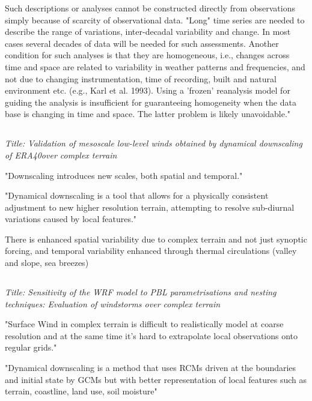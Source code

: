 \documentclass[12pt,a4paper]{article}
\begin{document}
Such descriptions or analyses cannot be constructed directly from observations simply because of scarcity of observational data. "Long" time series are needed to describe the range of variations, inter-decadal variability and change. In most cases several decades of data will be needed for such assessments. Another condition for such analyses is that they are homogeneous, i.e., changes across time and space are related to variability in weather patterns and frequencies, and not due to changing instrumentation, time of recording, built and natural environment etc. (e.g., Karl et al. 1993). Using a 'frozen' reanalysis model for guiding the analysis is insufficient for guaranteeing homogeneity when the data base is changing in time and space. The latter problem is likely unavoidable."

\subsection{\cite{Zagar2006}}

\textit{Title: Validation of mesoscale low-level winds obtained by dynamical downscaling of ERA40over complex terrain}
 
"Downscaling introduces new scales, both spatial and temporal."

"Dynamical downscaling is a tool that allows for a physically consistent adjustment to new higher resolution terrain, attempting to resolve sub-diurnal variations caused by local features."

There is enhanced spatial variability due to complex terrain and not just synoptic forcing, and temporal variability enhanced through thermal circulations (valley and slope, sea breezes) 


\subsection{\cite{Gomez-Navarro2015}}

\textit{Title:  Sensitivity of the WRF model to PBL parametrisations and nesting techniques: Evaluation of windstorms over complex terrain}

"Surface Wind in complex terrain is difficult to realistically model at coarse resolution and at the same time it's hard to extrapolate local observations onto regular grids."

"Dynamical downscaling is a method that uses RCMs driven at the boundaries and initial state by GCMs but with better representation of local features such as terrain, coastline, land use, soil moisture"
\end{document}
